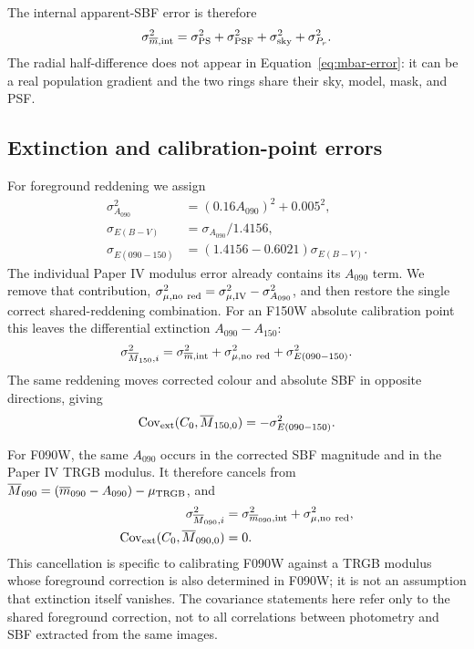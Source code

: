 \documentclass[nodoi,nocopyright]{pas}
\newcommand{\mbar}{\overline{m}}
\newcommand{\Mbar}{\overline{M}}
\begin{document}
The internal apparent-SBF error is therefore
\begin{equation}
 \sigma^2_{\mbar,\rm int}=
 \sigma^2_{\rm PS}+
 \sigma^2_{\rm PSF}+
 \sigma^2_{\rm sky}+
 \sigma^2_{P_r}.
 \label{eq:mbar-error}
\end{equation}
The radial half-difference does not appear in Equation~\ref{eq:mbar-error}: it can
be a real population gradient and the two rings share their sky, model, mask,
and PSF.

\subsection{Extinction and calibration-point errors}

For foreground reddening we assign
\begin{align}
 \sigma_{A_{090}}^2&=(0.16A_{090})^2+0.005^2,\\
 \sigma_{E(B-V)}&=\sigma_{A_{090}}/1.4156,\\
 \sigma_{E(090-150)}&=(1.4156-0.6021)\sigma_{E(B-V)}.
\end{align}
The individual Paper IV modulus error already contains its $A_{090}$ term.
We remove that contribution,
$\sigma_{\mu,{\rm no\ red}}^2=\sigma_{\mu,{\rm IV}}^2-
\sigma_{A_{090}}^2$, and then restore the single correct shared-reddening
combination. For an F150W absolute calibration point this leaves the
differential extinction $A_{090}-A_{150}$:
\begin{equation}
 \sigma^2_{\Mbar_{150},i}=
 \sigma^2_{\mbar,\rm int}+
 \sigma^2_{\mu,\rm no\ red}+
 \sigma^2_{E(090-150)}.
 \label{eq:f150-calibration-point-error}
\end{equation}
The same reddening moves corrected colour and absolute SBF in opposite
directions, giving
\begin{equation}
 {\rm Cov}_{\rm ext}(C_0,\Mbar_{150,0})=-\sigma^2_{E(090-150)}.
\end{equation}

For F090W, the same $A_{090}$ occurs in the corrected SBF magnitude and in
the Paper IV TRGB modulus. It therefore cancels from
$\Mbar_{090}=(\mbar_{090}-A_{090})-\mu_{\rm TRGB}$, and
\begin{equation}
 \begin{aligned}
 \sigma^2_{\Mbar_{090},i}&=
 \sigma^2_{\mbar_{090},\rm int}+\sigma^2_{\mu,\rm no\ red},
 \\
 {\rm Cov}_{\rm ext}(C_0,\Mbar_{090,0})&=0.
 \end{aligned}
 \label{eq:f090-calibration-point-error}
\end{equation}
This cancellation is specific to calibrating F090W against a TRGB modulus
whose foreground correction is also determined in F090W; it is not an
assumption that extinction itself vanishes. The covariance statements here
refer only to the shared foreground correction, not to all correlations
between photometry and SBF extracted from the same images.
\end{document}
